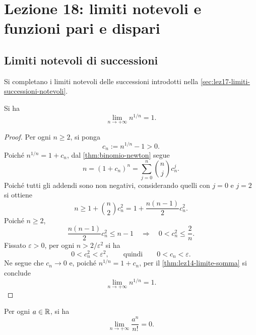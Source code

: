 \chapter[Lezione 18 --- 3 novembre 2026]{Lezione 18: limiti notevoli e funzioni pari e dispari}
\label{chap:lezione-18}

\section{Limiti notevoli di successioni}
\label{sec:lez18-limiti-successioni}

Si completano i limiti notevoli delle successioni introdotti nella
\cref{sec:lez17-limiti-successioni-notevoli}.

\begin{proposition}
\label{prop:lez18-radice-n-di-n}
Si ha
\[
  \lim_{n\to+\infty}n^{1/n}=1.
\]
\end{proposition}

\begin{proof}
Per ogni \(n\ge2\), si ponga
\[
  c_n:=n^{1/n}-1>0.
\]
Poiché \(n^{1/n}=1+c_n\), dal
\cref{thm:binomio-newton} segue
\[
  n=(1+c_n)^n
  =\sum_{j=0}^{n}\binom{n}{j}c_n^j.
\]
Poiché tutti gli addendi sono non negativi, considerando
quelli con \(j=0\) e \(j=2\) si ottiene
\[
  n\ge1+\binom{n}{2}c_n^2
    =1+\frac{n(n-1)}2c_n^2.
\]
Poiché \(n\ge2\),
\[
  \frac{n(n-1)}2c_n^2\le n-1
  \quad\Longrightarrow\quad
  0<c_n^2\le\frac2n.
\]
Fissato \(\varepsilon>0\), per ogni
\(n>2/\varepsilon^2\) si ha
\[
  0<c_n^2<\varepsilon^2,
  \qquad\text{quindi}\qquad 0<c_n<\varepsilon.
\]
Ne segue che \(c_n\to0\) e, poiché
\(n^{1/n}=1+c_n\), per il
\cref{thm:lez14-limite-somma} si conclude
\[
  \lim_{n\to+\infty}n^{1/n}=1.
\]
\end{proof}

\begin{proposition}
\label{prop:lez18-potenza-fattoriale}
Per ogni \(a\in\mathbb{R}\), si ha
\[
  \lim_{n\to+\infty}\frac{a^n}{n!}=0.
\]
\end{proposition}

